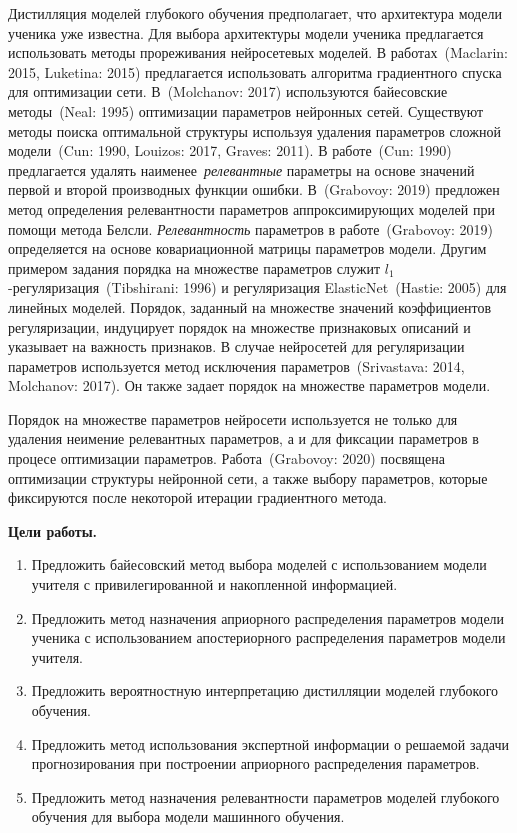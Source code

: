 \documentclass{dissert}
\begin{document}
Дистилляция моделей глубокого обучения предполагает, что архитектура модели ученика уже известна. Для выбора архитектуры модели ученика предлагается использовать методы прореживания нейросетевых моделей. В работах~(Maclarin: 2015, Luketina: 2015) предлагается использовать алгоритма градиентного спуска для оптимизации сети. В~(Molchanov: 2017) используются байесовские методы~(Neal: 1995) оптимизации параметров нейронных сетей. Существуют методы поиска оптимальной структуры используя удаления параметров сложной модели~(Cun: 1990, Louizos: 2017, Graves: 2011). В работе~(Cun: 1990) предлагается удалять наименее~\textit{релевантные} параметры на основе значений первой и второй производных функции ошибки. В~(Grabovoy: 2019) предложен метод определения релевантности параметров аппроксимирующих моделей при помощи метода Белсли. \textit{Релевантность} параметров в работе~(Grabovoy: 2019) определяется на основе ковариационной матрицы параметров модели.
Другим примером задания порядка на множестве параметров служит $l_1$-регуляризация~(Tibshirani: 1996) и регуляризация ElasticNet~(Hastie: 2005) для линейных моделей.
Порядок, заданный на множестве значений коэффициентов регуляризации, индуцирует порядок на множестве признаковых описаний и указывает на важность признаков.
В случае нейросетей для регуляризации параметров используется метод исключения параметров~(Srivastava: 2014, Molchanov: 2017).
Он также задает порядок на множестве параметров модели.

Порядок на множестве параметров нейросети используется не только для удаления неимение релевантных параметров, а и для фиксации параметров в процесе оптимизации параметров. Работа~(Grabovoy: 2020) посвящена оптимизации структуры нейронной сети, а также выбору параметров, которые фиксируются после некоторой итерации градиентного метода. 


\vspace{0.5cm}
\textbf{Цели работы.}
\vspace{0.2cm}
\begin{enumerate}
\item Предложить байесовский метод выбора моделей с использованием модели учителя с привилегированной и накопленной информацией.
\item Предложить метод назначения априорного распределения параметров модели ученика с использованием апостериорного распределения параметров модели учителя.
\item Предложить вероятностную интерпретацию дистилляции моделей глубокого обучения.
\item Предложить метод использования экспертной информации о решаемой задачи прогнозирования при построении априорного распределения параметров.
\item Предложить метод назначения релевантности параметров моделей глубокого обучения для выбора модели машинного обучения.
\end{enumerate}
\end{document}
